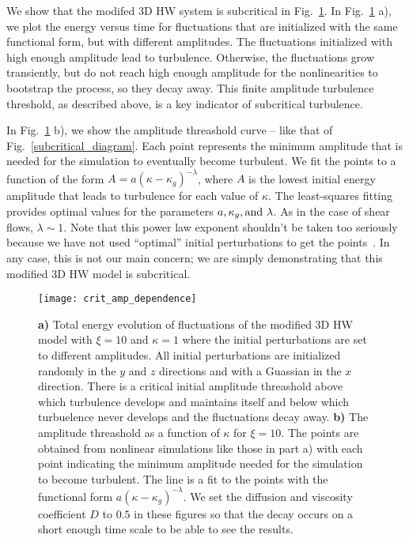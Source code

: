 \documentclass[twocolumn,showkeys,superscriptaddress]{revtex4}
\begin{document}
We show that the modifed 3D HW system is subcritical in Fig.~\ref{crit_amp_dependence}. In Fig.~\ref{crit_amp_dependence} a), we plot the energy versus time for fluctuations that are initialized with the same functional form, but with
different amplitudes.
The fluctuations initialized with high enough amplitude lead to turbulence. 
Otherwise, the fluctuations grow transiently, but do not reach high enough amplitude for the nonlinearities to bootstrap the process, so they decay away. 
This finite amplitude turbulence threshold, as described above, is a key indicator of subcritical turbulence.

In Fig.~\ref{crit_amp_dependence} b), we show the amplitude threashold curve -- like that of Fig.~\ref{subcritical_diagram}. Each point represents the minimum amplitude that is needed for the simulation to eventually become
turbulent. We fit the points to a function of the form $A = a (\kappa - \kappa_g)^{- \lambda}$, 
where $A$ is the lowest initial energy amplitude that leads to turbulence for each value of $\kappa$. The least-squares fitting provides optimal values for the parameters $a, \kappa_g, \rm{and} \ \lambda$. 
As in the case of shear flows, $\lambda \sim 1$. Note that this power law exponent shouldn't be taken too seriously because we have not used ``optimal'' initial perturbations to get the points~\cite{cossu2005}. 
In any case, this is not our main concern; we are simply demonstrating that this modified 3D HW model is subcritical.

\begin{figure}
\centerline{\texttt{[image: crit\_amp\_dependence]}}
\caption{{\bf a)} Total energy evolution of fluctuations of the modified 3D HW model with $\xi=10$ and $\kappa=1$ where the initial perturbations are set to different amplitudes. 
All initial perturbations are initialized randomly in the $y$ and $z$ directions and with a Guassian in the $x$ direction. 
There is a critical initial amplitude threashold above which turbulence develops and maintains itself and below which turbuelence never develops and the fluctuations decay away. 
{\bf b)} The amplitude threashold as a function of $\kappa$ for $\xi=10$. The points are obtained from nonlinear simulations like those in part a) with each point indicating the minimum amplitude needed for the simulation
to become turbulent. The line is a fit to the points with the functional form $a (\kappa-\kappa_g)^{- \lambda}$.
We set the diffusion and viscosity coefficient $D$ to $0.5$ in these figures so that the decay occurs on a short enough time scale to be able to see the results.}
\label{crit_amp_dependence}
\end{figure}
\end{document}
